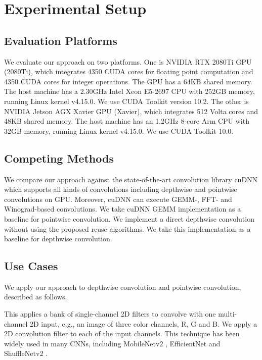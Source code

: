 

\section{Experimental Setup}

\subsection{Evaluation Platforms} We evaluate our approach on two platforms. 
One is NVIDIA RTX 2080Ti GPU (2080Ti), which integrates 4350 CUDA cores for floating point computation and 4350 CUDA cores for integer operations. 
The GPU has a 64KB shared memory. 
The host machine has a 2.30GHz Intel Xeon E5-2697 CPU with 252GB memory, running Linux kernel v4.15.0. We use CUDA Toolkit version 10.2.
The other is NVIDIA Jetson AGX Xavier GPU (Xavier), which integrates 512 Volta cores and 48KB shared memory.
The host machine has an 1.2GHz 8-core Arm CPU with 32GB memory, running Linux kernel v4.15.0. We use CUDA Toolkit 10.0. 


\subsection{Competing Methods} We compare our approach against the state-of-the-art convolution library cuDNN which supports all kinds of convolutions including depthwise and pointwise convolutions on GPU. 
  Moreover, cuDNN can execute GEMM-, FFT- and Winograd-based convolutions. We take cuDNN GEMM implementation as a baseline for pointwise convolution.
  We implement a direct depthwise convolution without using the proposed reuse algorithms. We take this implementation as a baseline for depthwise convolution.


\subsection{Use Cases}
We apply our approach to depthwise convolution and pointwise convolution, described as follows.

 This applies a bank of single-channel 2D filters to convolve with one multi-channel 2D input, e.g., an image of three color channels, R, G and B. We apply a 2D convolution filter to each of the input channels. 
This technique has been widely used in many CNNs, including MobileNetv2 \cite{Sandler_2018_CVPR}, EfficientNet \cite{tan2019efficientnet} and ShuffleNetv2 \cite{Ma_2018_ECCV}.


